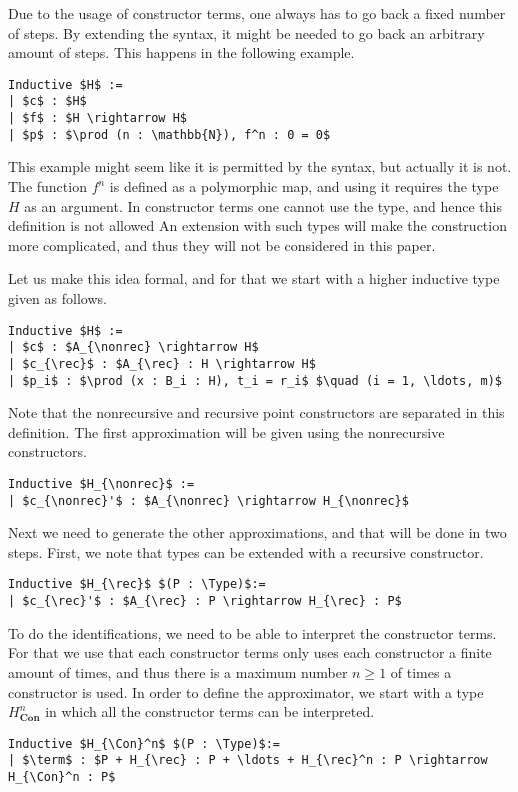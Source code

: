 \documentclass[a4paper,UKenglish]{lipics-v2016}
\newcommand{\rec}[0]{\operatorname{rec}}
\newcommand{\nonrec}[0]{\operatorname{nonrec}}
\newcommand{\term}[0]{\textbf{term}}
\newcommand{\Con}[0]{\textbf{Con}}
\newcommand{\Type}[0]{\operatorname{\textsc{Type}}}
\begin{document}
Due to the usage of constructor terms, one always has to go back a fixed number of steps.
By extending the syntax, it might be needed to go back an arbitrary amount of steps.
This happens in the following example.
\lstset{language=Coq}
\begin{lstlisting}
Inductive $H$ :=
| $c$ : $H$
| $f$ : $H \rightarrow H$
| $p$ : $\prod (n : \mathbb{N}), f^n : 0 = 0$
\end{lstlisting}
This example might seem like it is permitted by the syntax, but actually it is not.
The function $f^n$ is defined as a polymorphic map, and using it requires the type $H$ as an argument.
In constructor terms one cannot use the type, and hence this definition is not allowed
An extension with such types will make the construction more complicated, and thus they will not be considered in this paper.

Let us make this idea formal, and for that we start with a higher inductive type given as follows.
\lstset{language=Coq}
\begin{lstlisting}[label={lst:HIT}]
Inductive $H$ :=
| $c$ : $A_{\nonrec} \rightarrow H$
| $c_{\rec}$ : $A_{\rec} : H \rightarrow H$
| $p_i$ : $\prod (x : B_i : H), t_i = r_i$ $\quad (i = 1, \ldots, m)$
\end{lstlisting}
Note that the nonrecursive and recursive point constructors are separated in this definition.
The first approximation will be given using the nonrecursive constructors.
\lstset{language=Coq}
\begin{lstlisting}
Inductive $H_{\nonrec}$ :=
| $c_{\nonrec}'$ : $A_{\nonrec} \rightarrow H_{\nonrec}$
\end{lstlisting}

Next we need to generate the other approximations, and that will be done in two steps.
First, we note that types can be extended with a recursive constructor.
\lstset{language=Coq}
\begin{lstlisting}
Inductive $H_{\rec}$ $(P : \Type)$:=
| $c_{\rec}'$ : $A_{\rec} : P \rightarrow H_{\rec} : P$
\end{lstlisting}
To do the identifications, we need to be able to interpret the constructor terms.
For that we use that each constructor terms only uses each constructor  a finite amount of times, and thus there is a maximum number $n \geq 1$ of times a constructor is used.
In order to define the approximator, we start with a type $H_{\Con}^n$ in which all the constructor terms can be interpreted.
\lstset{language=Coq}
\begin{lstlisting}
Inductive $H_{\Con}^n$ $(P : \Type)$:=
| $\term$ : $P + H_{\rec} : P + \ldots + H_{\rec}^n : P \rightarrow H_{\Con}^n : P$
\end{lstlisting}
\end{document}
